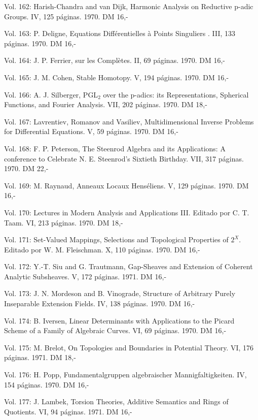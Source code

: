Vol. 162: Harish-Chandra and van Dijk, Harmonic Analysis on Reductive p-adic Groups. IV, 125 páginas. 1970. DM 16,-

Vol. 163: P. Deligne, Equations Différentielles à Points Singuliers . III, 133 páginas. 1970. DM 16,-

Vol. 164: J. P. Ferrier,  sur les  Complètes. II, 69 páginas. 1970. DM 16,-

Vol. 165: J. M. Cohen, Stable Homotopy. V, 194 páginas. 1970. DM 16,-

Vol. 166: A. J. Silberger, PGL$_2$ over the p-adics: its Representations, Spherical Functions, and Fourier Analysis. VII, 202 páginas. 1970. DM 18,-

Vol. 167: Lavrentiev, Romanov and Vasiliev, Multidimensional Inverse Problems for Differential Equations. V, 59 páginas. 1970. DM 16,-

Vol. 168: F. P. Peterson, The Steenrod Algebra and its Applications: A conference to Celebrate N. E. Steenrod's Sixtieth Birthday. VII, 317 páginas. 1970. DM 22,-

Vol. 169: M. Raynaud, Anneaux Locaux Henséliens. V, 129 páginas. 1970. DM 16,-

Vol. 170: Lectures in Modern Analysis and Applications III. Editado por C. T. Taam. VI, 213 páginas. 1970. DM 18,-

Vol. 171: Set-Valued Mappings, Selections and Topological Properties of $2^X$. Editado por W. M. Fleischman. X, 110 páginas. 1970. DM 16,-

Vol. 172: Y.-T. Siu and G. Trautmann, Gap-Sheaves and Extension of Coherent Analytic Subsheaves. V, 172 páginas. 1971. DM 16,-

Vol. 173: J. N. Mordeson and B. Vinograde, Structure of Arbitrary Purely Inseparable Extension Fields. IV, 138 páginas. 1970. DM 16,-

Vol. 174: B. Iversen, Linear Determinants with Applications to the Picard Scheme of a Family of Algebraic Curves. VI, 69 páginas. 1970. DM 16,-

Vol. 175: M. Brelot, On Topologies and Boundaries in Potential Theory. VI, 176 páginas. 1971. DM 18,-

Vol. 176: H. Popp, Fundamentalgruppen algebraischer Mannigfaltigkeiten. IV, 154 páginas. 1970. DM 16,-

Vol. 177: J. Lambek, Torsion Theories, Additive Semantics and Rings of Quotients. VI, 94 páginas. 1971. DM 16,-

